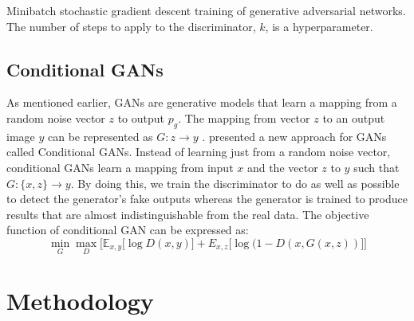 \documentclass[oneside,a4paper,12pt]{report}
\begin{document}
\SetAlgoNoLine%
\begin{algorithm}[!htb]
 \caption{Minibatch stochastic gradient descent training of generative adversarial networks. The number of steps to apply to the discriminator, $k$, is a hyperparameter.}
\end{algorithm}

\subsection{Conditional GANs}
\hspace*{0.25 in}As mentioned earlier, GANs are generative models that learn a mapping from a random noise vector $z$ to output $p_g$. The mapping from vector $z$ to an output image $y$ can be represented as $G: z \rightarrow y$ \citep{goodfellow2014generative}. \cite{isola2018imagetoimage} presented a new approach for GANs called Conditional GANs. Instead of learning just from a random noise vector, conditional GANs learn a mapping from input $x$ and the vector $z$ to $y$ such that $G: \{x,z\} \rightarrow y$. By doing this, we train the discriminator to do as well as possible to detect the generator's fake outputs whereas the generator is trained to produce results that are almost indistinguishable from the real data. The objective function of conditional GAN can be expressed as:
$$
		\min_{G}\max_{D}\Big[\mathbb{E}_{x,y}\big[ \log D(x,y)\big] + E_{x,z}\big[ \log(1 - D(x, G(x,z))\big]\Big]
$$

\section{Methodology}
\end{document}

